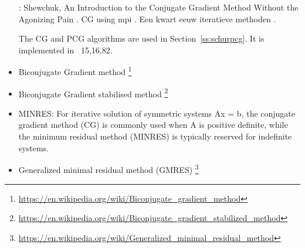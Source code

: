 \begin{itemize}
\Literature: Shewchuk, An Introduction to the Conjugate 
Gradient Method Without the Agonizing Pain \cite{shew94}.
CG using mpi \cite{siho04}.
Een kwart eeuw iteratieve methoden \cite{vuik09}.

The CG and PCG algorithms are used in Section~\ref{ss:schurpcg}.
It is implemented in \stone~15,16,82.

\item Biconjugate Gradient method
\footnote{\url{https://en.wikipedia.org/wiki/Biconjugate_gradient_method}}
\item Biconjugate Gradient stabilised method
\footnote{\url{https://en.wikipedia.org/wiki/Biconjugate_gradient_stabilized_method}}
\item MINRES: For iterative solution of symmetric systems Ax = b, the conjugate gradient method
(CG) is commonly used when A is positive definite, while the minimum residual method (MINRES)
is typically reserved for indefinite systems.
\item Generalized minimal residual method (GMRES)
\footnote{\url{https://en.wikipedia.org/wiki/Generalized_minimal_residual_method}}
\end{itemize}






